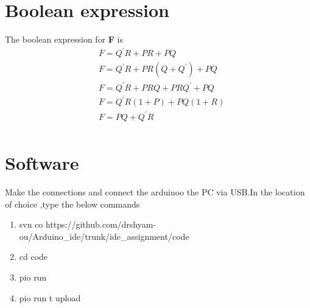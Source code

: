 \documentclass[journal,10pt,twocolumn]{article}
\begin{document}
\section*{\large Boolean expression}
The boolean expression for \textbf{F} is
\begin{align*}%
&F=Q^{\prime}R+PR+PQ\\
&F=Q^{\prime}R+PR(Q+Q^{\prime})+PQ\\
&F=Q^{\prime}R+PRQ+PRQ^{\prime}+PQ\\
&F=Q^{\prime}R(1+P)+PQ(1+R)\\
&F=PQ+Q^{\prime}R\\
\end{align*}

\section*{\large Software}
Make the connections and connect the arduinoo the PC via USB.In the location of choice ,type the below commands
\begin{enumerate}
\item svn co https://github.com/drshyam-ou/Arduino\_ide/trunk/ide\_assignment/code
\item cd code
\item pio run
\item pio run \-t upload
\end{enumerate}
\end{document}
